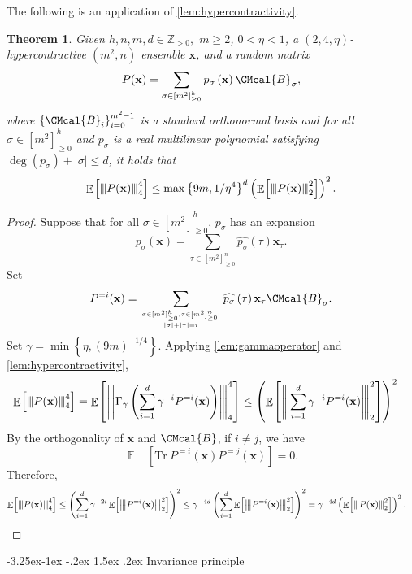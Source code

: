 \documentclass[11pt]{article}
\makeatletter
\renewcommand{\subsection}{\@startsection{subsection}{2}{\z@}%
             {-3.25ex\@plus -1ex \@minus -.2ex}%
             {1.5ex \@plus .2ex}%
             {\normalfont\large\scshape\bfseries}}
\def\B{\CMcal{B}}
\theoremstyle{plain}
\newtheorem{theorem}{Theorem}[section]
\theoremstyle{definition}
\newcommand {\minusspace} {\: \! \!}
\newcommand {\Fn} [2] {\ensuremath{ #1 \minusspace \Br{ #2 } }}
\newcommand {\set} [1] {\ensuremath{ \left\lbrace #1 \right\rbrace }}
\newcommand {\br} [1] {\ensuremath{ \left( #1 \right) }}
\newcommand {\Br} [1] {\ensuremath{ \left[ #1 \right] }}
\newcommand {\ab} [1] {\ensuremath{ \left| #1 \right| }}
\DeclareMathOperator*{\bigE}{\mathbb{E}}
\newcommand {\expec} [2] {\Fn{\bigE_{\substack{#1}}}{#2}}
\newcommand{\nnorm}[1]{{\left\vert\kern-0.25ex\left\vert\kern-0.25ex\left\vert #1
		\right\vert\kern-0.25ex\right\vert\kern-0.25ex\right\vert}}
\newcommand {\Tr} {\ensuremath{ \mathrm{Tr} }}
\newcommand{\posint}{{\mathbb Z}_{>0}}
\newcommand{\randx}{\ensuremath{\mathbf{x}}}
\newcommand{\1}{\mathbb{1}} %
\makeatother
\begin{document}
	The following is an application of \cref{lem:hypercontractivity}.
	\begin{theorem}\label{lem:hybridHC}
		Given $h,n,m,d\in\posint,$ $m\geq 2$, $0<\eta<1$, a $(2,4,\eta)$-hypercontractive  $(m^2,n)$ ensemble $\randx$, and a random matrix
 \begin{equation*}
P(\randx)=\sum_{\sigma\in\Br{m^2}_{\geq0}^h}p_\sigma\br{\randx}\B_\sigma,
	\end{equation*}
	where $\set{\B_i}_{i=0}^{m^2-1}$ is a standard orthonormal basis and for all $\sigma\in\Br{m^2}_{\geq0}^h$ and $p_\sigma$ is a real multilinear polynomial satisfying $\deg\br{p_\sigma}+\ab{\sigma}\leq d$, it holds that
   \[\expec{}{\nnorm{P(\randx)}_4^4}\leq\max\set{9m,1/\eta^4}^d\br{\expec{}{\nnorm{P(\randx)}_2^2}}^2.\]
	\end{theorem}
	\begin{proof}
	Suppose that for all $\sigma\in[m^2]_{\geq0}^h$, $p_\sigma$ has an expansion
\[p_\sigma(\randx)=\sum_{\tau\in\Br{m^2}_{\geq0}^n}\widehat{p_\sigma}(\tau)\randx_\tau.\]
		 Set $$P^{=i}(\randx)=\sum_{\genfrac{}{}{0pt}{}{\sigma\in[m^2]_{\geq0}^h,\tau\in\Br{m^2}_{\geq0}^n :}{\ab{\sigma}+\ab{\tau}=i}}\widehat{p_{\sigma}}\br{\tau}\randx_\tau\B_{\sigma}.$$
	 Set $\gamma=\min\set{\eta,\br{9m}^{-1/4}}$. Applying \cref{lem:gammaoperator} and \cref{lem:hypercontractivity},
		\begin{align*} \expec{}{\nnorm{P(\randx)}_4^4}&= \expec{}{\nnorm{\Gamma_{\gamma}\br{\sum_{i=1}^{d}\gamma^{-i} P^{=i}(\randx)}}_4^4}\leq \br{\expec{}{\nnorm{\sum_{i=1}^{d}\gamma^{-i} P^{=i}(\randx)}^2_2}}^{2}
		\end{align*}
		By the orthogonality of $\randx$ and $\B$, if $i\ne j$, we have
		\[\expec{}{\Tr~P^{=i}(\randx)P^{=j}(\randx)}=0.\]
		Therefore,
\begin{align*}
\expec{}{\nnorm{P(\randx)}_4^4}&\leq\br{\sum_{i=1}^{d}\gamma^{-2i}\expec{}{\nnorm{P^{=i}(\randx)}^2_2}}^{2}\leq\gamma^{-4d}\br{\sum_{i=1}^{d}\expec{}{\nnorm{P^{=i}(\randx)}^2_2}}^{2}=\gamma^{-4d}\br{\expec{}{\nnorm{P(\randx)}_2^2}}^2.
\end{align*}
		
	\end{proof}
	
\subsection{Invariance principle}
\end{document}
